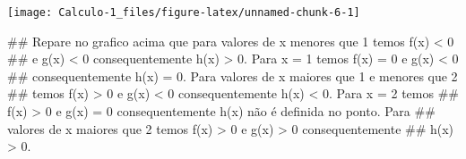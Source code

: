 \documentclass[]{book}
\newenvironment{Shaded}{\begin{snugshade}}{\end{snugshade}}
\newcommand{\NormalTok}[1]{#1}
\begin{document}
\begin{enumerate}
  \begin{center}\texttt{[image: Calculo-1\_files/figure-latex/unnamed-chunk-6-1]} \end{center}

\begin{Shaded}
\begin{Highlighting}[]
\NormalTok{##  Repare no grafico acima que para valores de x menores que 1 temos f(x) < 0}
\NormalTok{## e g(x) < 0 consequentemente h(x) > 0. Para x = 1 temos f(x) = 0 e g(x) < 0}
\NormalTok{## consequentemente h(x) = 0. Para valores de x maiores que 1 e menores que 2}
\NormalTok{## temos f(x) > 0 e g(x) < 0 consequentemente h(x) < 0. Para x = 2 temos}
\NormalTok{## f(x) > 0 e g(x) = 0 consequentemente h(x) não é definida no ponto. Para}
\NormalTok{## valores de x maiores que 2 temos f(x) > 0 e g(x) > 0 consequentemente}
\NormalTok{## h(x) > 0.}
\end{Highlighting}
\end{Shaded}
\end{enumerate}


\end{document}
